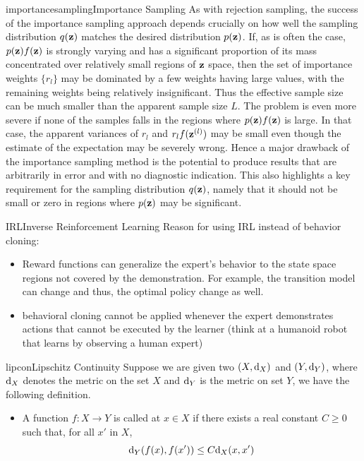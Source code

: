 \documentclass[9pt]{article}
\begin{document}
\begin{topic}{importancesampling}{Importance Sampling}
As with rejection sampling, the success of the importance sampling approach depends crucially on how well the sampling distribution $q(\mathbf{z})$ matches the desired distribution $p(\mathbf{z})$. If, as is often the case, $p(\mathbf{z})f(\mathbf{z})$ is strongly varying and has a significant proportion of its mass concentrated over relatively small regions of $\mathbf{z}$ space, then the set of importance weights $\{r_l\}$ may be dominated by a few weights having large values, with the remaining weights being relatively insignificant. Thus the effective sample size can be much smaller than the apparent sample size $L$. The problem is even more severe if none of the samples falls in the regions where $p(\mathbf{z})f(\mathbf{z})$ is large. In that case, the apparent variances of $r_l$ and $r_l f(\mathbf{z}^{(l)})$ may be small even though the estimate of the expectation may be severely wrong. Hence a major drawback of the importance sampling method is the potential to produce results that are arbitrarily in error and with no diagnostic indication. This also highlights a key requirement for the sampling distribution $q(\mathbf{z})$, namely that it should not be small or zero in regions where $p(\mathbf{z})$ may be significant.
\end{topic}

\begin{topic}{IRL}{Inverse Reinforcement Learning} 
Reason for using IRL instead of behavior cloning:
\begin{itemize}
\item Reward functions can generalize the expert's behavior to the state space regions not covered by the demonstration. For example, the transition model can change and thus, the optimal policy change as well. 
\item behavioral cloning cannot be applied whenever the expert demonstrates actions that cannot be executed by the
learner (think at a humanoid robot that learns by observing a human expert)
\end{itemize}
\end{topic}

\begin{topic}{lipcon}{Lipschitz Continuity}
Suppose we are given two  $(X,\mathrm{d}_X)$ and $(Y,\mathrm{d}_Y)$, where $\mathrm{d}_X$ denotes the metric on the set $X$ and $\mathrm{d}_Y$ is the metric on set $Y$, we have the following definition.
\begin{itemize}
\item A function $f:X\rightarrow Y$ is called  at $x\in X$ if there exists a real constant $C\geq 0$ such that, for all $x'$ in $X$,
\[
\mathrm{d}_Y(f(x), f(x')) \le C \mathrm{d}_X(x, x')
\]
\end{itemize}
\citep{Eriksson2013Applied}
\end{topic}
\end{document}

